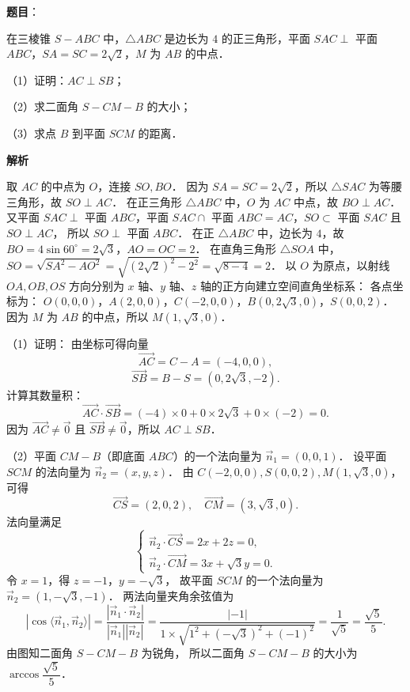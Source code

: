 \begin{answer}

\textbf{题目}：

在三棱锥 $S - ABC$ 中，$\triangle ABC$ 是边长为 $4$ 的正三角形，平面 $SAC \perp$ 平面 $ABC$，$SA = SC = 2\sqrt{2}$，$M$ 为 $AB$ 的中点．

（1）证明：$AC \perp SB$；

（2）求二面角 $S - CM - B$ 的大小；

（3）求点 $B$ 到平面 $SCM$ 的距离．
\nopagebreak[4]
\begin{center}\end{center}
\nopagebreak[4]
\textbf{解析}

取 $AC$ 的中点为 $O$，连接 $SO, BO$．
因为 $SA = SC = 2\sqrt{2}$，所以 $\triangle SAC$ 为等腰三角形，故 $SO \perp AC$．
在正三角形 $\triangle ABC$ 中，$O$ 为 $AC$ 中点，故 $BO \perp AC$．
又平面 $SAC \perp$ 平面 $ABC$，平面 $SAC \cap$ 平面 $ABC = AC$，$SO \subset$ 平面 $SAC$ 且 $SO \perp AC$，
所以 $SO \perp$ 平面 $ABC$．
在正 $\triangle ABC$ 中，边长为 $4$，故 $BO = 4 \sin 60^\circ = 2\sqrt{3}$，$AO = OC = 2$．
在直角三角形 $\triangle SOA$ 中，$SO = \sqrt{SA^2 - AO^2} = \sqrt{(2\sqrt{2})^2 - 2^2} = \sqrt{8 - 4} = 2$．
以 $O$ 为原点，以射线 $OA, OB, OS$ 方向分别为 $x$ 轴、$y$ 轴、$z$ 轴的正方向建立空间直角坐标系：
各点坐标为：
$O(0, 0, 0)$，$A(2, 0, 0)$，$C(-2, 0, 0)$，$B(0, 2\sqrt{3}, 0)$，$S(0, 0, 2)$．
因为 $M$ 为 $AB$ 的中点，所以 $M(1, \sqrt{3}, 0)$．
\nopagebreak[4]
\begin{center}\end{center}
\nopagebreak[4]
（1）证明：
由坐标可得向量
\nopagebreak[4]
\[
\vec{AC} = C - A = (-4, 0, 0),
\]
\nopagebreak[4]
\[
\vec{SB} = B - S = (0, 2\sqrt{3}, -2).
\]
计算其数量积：
\nopagebreak[4]
\[
\vec{AC} \cdot \vec{SB} = (-4) \times 0 + 0 \times 2\sqrt{3} + 0 \times (-2) = 0.
\]
因为 $\vec{AC} \neq \vec{0}$ 且 $\vec{SB} \neq \vec{0}$，所以 $AC \perp SB$．

（2）平面 $CM - B$（即底面 $ABC$）的一个法向量为 $\vec{n}_1 = (0, 0, 1)$．
设平面 $SCM$ 的法向量为 $\vec{n}_2 = (x, y, z)$．
由 $C(-2, 0, 0), S(0, 0, 2), M(1, \sqrt{3}, 0)$，可得
\nopagebreak[4]
\[
\vec{CS} = (2, 0, 2), \quad \vec{CM} = (3, \sqrt{3}, 0).
\]
法向量满足
\nopagebreak[4]
\[
\begin{cases}
\vec{n}_2 \cdot \vec{CS} = 2x + 2z = 0, \\
\vec{n}_2 \cdot \vec{CM} = 3x + \sqrt{3}y = 0.
\end{cases}
\]
令 $x = 1$，得 $z = -1$，$y = -\sqrt{3}$，
故平面 $SCM$ 的一个法向量为 $\vec{n}_2 = (1, -\sqrt{3}, -1)$．
两法向量夹角余弦值为
\nopagebreak[4]
\[
|\cos\langle \vec{n}_1, \vec{n}_2 \rangle| = \frac{|\vec{n}_1 \cdot \vec{n}_2|}{|\vec{n}_1||\vec{n}_2|} = \frac{|-1|}{1 \times \sqrt{1^2 + (-\sqrt{3})^2 + (-1)^2}} = \frac{1}{\sqrt{5}} = \frac{\sqrt{5}}{5}.
\]
由图知二面角 $S - CM - B$ 为锐角，
所以二面角 $S - CM - B$ 的大小为 $\arccos\dfrac{\sqrt{5}}{5}$．


\end{answer}
